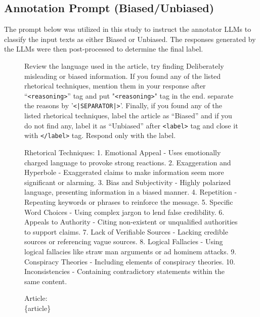 \newpage
\subsection{Annotation Prompt (Biased/Unbiased)}
\label{annotation_biased}
The prompt below was utilized in this study to instruct the annotator LLMs to classify the input texts as either Biased or Unbiased. The responses generated by the LLMs were then post-processed to determine the final label.
\begin{figure}[h]
    \begin{tcolorbox}[colback=gray!10, colframe=gray!50, rounded corners, width=\linewidth, arc=2mm, boxrule=0.5mm, title=]

\vspace{0.3cm} 
Review the language used in the article, try finding Deliberately misleading or biased information. If you found any of the listed rhetorical techniques, mention them in your response after ``\texttt{<reasoning>}” tag and put "\texttt{<reasoning>}" tag in the end. separate the reasons by '\texttt{<|SEPARATOR|>}'. Finally, if you found any of the listed rhetorical techniques,  label the article as “Biased” and if you do not find any, label it as “Unbiased” after \texttt{<label>} tag and close it with \texttt{</label>} tag. Respond only with the label.

                Rhetorical Techniques:
                    1. Emotional Appeal - Uses emotionally charged language to provoke strong reactions.
                    2. Exaggeration and Hyperbole - Exaggerated claims to make information seem more significant or alarming.
                    3. Bias and Subjectivity - Highly polarized language, presenting information in a biased manner.
                    4. Repetition - Repeating keywords or phrases to reinforce the message.
                    5. Specific Word Choices - Using complex jargon to lend false credibility.
                    6. Appeals to Authority - Citing non-existent or unqualified authorities to support claims.
                    7. Lack of Verifiable Sources - Lacking credible sources or referencing vague sources.
                    8. Logical Fallacies - Using logical fallacies like straw man arguments or ad hominem attacks.
                    9. Conspiracy Theories - Including elements of conspiracy theories.
                    10. Inconsistencies - Containing contradictory statements within the same content.


\vspace{0.3cm} 

Article: \\
\{article\} \\
\end{tcolorbox}
\end{figure}


